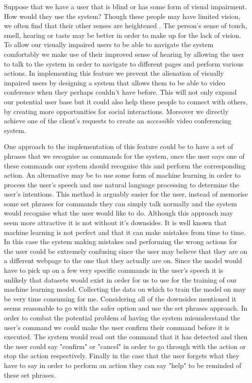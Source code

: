 Suppose that we have a user that is blind or has some form
of visual impairment. How would they use the system? Though
these people may have limited vision, we often find that
their other senses are heightened \cite{blind}. The person's
sense of touch, smell, hearing or taste may be better in order
to make up for the lack of vision. To allow our visually
impaired users to be able to navigate the system comfortably
we make use of their improved sense of hearing by allowing the
user to talk to the system in order to navigate to different
pages and perform various actions. In implementing this
feature we prevent the alienation of visually impaired users
by designing a system that allows them to be able to video
conference when they perhaps couldn't have before. This will
not only expand our potential user base but it could also
help these people to connect with others, by creating more
opportunities for social interactions. Moreover
we directly achieve one of the client's requests to create
an \textit{accessible} video conferencing system. \\
\vspace{0.2cm}

One approach to the implementation of this feature could
be to have a set of phrases that we recognise as commands
for the system, once
the user says one of these commands our system should
recognise this and perform the corresponding action. An
alternative may be to use some form of machine learning in
order to process the user's speech and use natural language
processing to determine the user's intentions. This method is
arguably easier for the user, instead of memorise some set
phrases for commands they can simply talk normally and the
system would recognise what the user would like to do.
Although this approach may seem more attractive it is not
without it's downsides. It is well known that machine
learning is not perfect and that it can make mistakes from
time to time. In this case the system making mistakes and
performing the wrong actions for the user could be extremely
confusing since the user may believe that they are on a
different webpage to the one that they actually are on. Since
the model would have to pick up on a few very specific
commands in the user's speech it is unlikely that datasets
would exist in order for us to use for the training of our
machine learning model. Collecting the data on
which to train the model on may be very time consuming for me.
Considering all of the downsides mentioned it seems
reasonable to go with the safer option and use the set
phrases approach. In order to combat the potential problem of
having the system misunderstand the user's command we could
make the user confirm their command before it is executed.
The system would read out the command that it has detected and
then the user could say "confirm" or "cancel" in order to
go through with the action or stop the action respectively.
Finally in the case that the user forgets what they have to
say in order to perform an action they can say "help" to be
reminded of these set phrases.
\\ \vspace{0.2cm}


